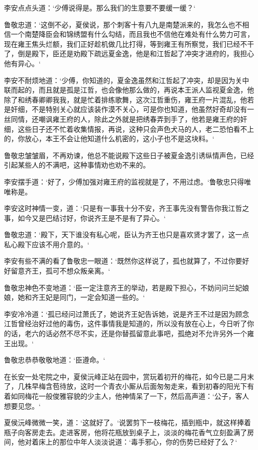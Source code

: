 李安点点头道：‘少傅说得是。那么我们的生意要不要缓一缓？‘

鲁敬忠道：‘这倒不必，夏侯说，那个刺客十有八九是南楚派来的，我怎么也不相信一个南楚降臣会和锦绣盟有什么勾结，而且我也不信他在难处有什么势力可言，现在雍王焦头烂额，我们正好趁机做几比打得，等到雍王有所察觉，我们已经不干了，倒是殿下，臣还是劝殿下疏远夏金逸，他是和江哲起了冲突才进府的，我担心他有异心。‘

李安不耐烦地道：‘少傅，你知道的，夏金逸虽然和江哲起了冲突，却是因为关中联而起的，而且就是孤是江哲，也会像他那么做的，再说本王派人监视夏金逸，他除了和绣春卿卿我我，就是忙着排练歌舞，这次江哲重伤，雍王府一片混乱，他若是奸细，不是特别关心就应该装作漠不关心，可是你也知道，他虽然好奇却没有一丝同情，还嘲讽雍王府的人，除此之外就是把绣春弄到手了，他若是雍王府的奸细，这些日子还不忙着收集情报，再说，这种只会声色犬马的人，老二恐怕看不上的，你放心，本王不会让他知道什么机密的，这小子也不是这块料。‘

鲁敬忠皱皱眉，不再劝谏，他总不能说殿下这些日子被夏金逸引诱纵情声色，已经引起某些人的不满吧，这种事情劝也劝不来的。

李安摆手道：‘好了，少傅加强对雍王府的监视就是了，不用过虑。‘鲁敬忠只得唯唯称是。

李安这时神情一变，道：‘只是有一事我十分不安，齐王事先没有警告你我江哲之事，如今又是巴结讨好，你说齐王是不是有了异心。‘

鲁敬忠道：‘殿下，天下谁没有私心呢，臣认为齐王也只是喜欢贤才罢了，这一点私心殿下应该不用介意的。‘

李安有些不满的看了鲁敬忠一眼道：‘既然你这样说了，孤也就算了，不过你要好好留意齐王，孤可不想众叛亲离。‘

鲁敬忠神色不变地道：‘臣一定注意齐王的举动，若是殿下担心，不妨问问兰妃娘娘，她和齐王妃是同门，一定会知道一些的。‘

李安冷冷道：‘孤已经问过萧氏了，她说齐王妃告诉她，说是齐王不过是因为顾念江哲曾经治好过他的毒伤，这件事情我是知道的，所以没有放在心上，今日听了你的话，老六的话必然不尽不实，还是你替孤留意此事吧，孤绝对不允许另外一个雍王出现。‘

鲁敬忠恭恭敬敬地道：‘臣遵命。‘

在长安一处宅院之中，夏侯沅峰正站在园中，赏玩着初开的梅花，如今已是二月末了，几株早梅含苞待放，这时一个青衣小厮从后面匆匆走来，看到初春的阳光下有着如同梅花一般俊雅容貌的少主人，他神情呆了一下，然后高声道：‘公子，客人想要见您。‘

夏侯沅峰微微一笑，道：‘这就好了。‘说罢剪下一枝梅花，插到瓶中，就这样捧着瓶子向客房走去。走进客房，他将花瓶放到桌子上，淡淡的梅花香气立刻盈满了房间，他对着床上的那位中年人淡淡说道：‘毒手邪心，你的伤势已经好了么？‘

